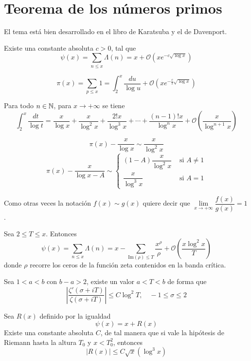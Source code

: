 \documentclass[TAN.tex]{subfiles}
\begin{document}
\section{Teorema de los números primos}
El tema está bien desarrollado en el libro de Karatsuba y el de Davenport.

\begin{teorema}
Existe una constante absoluta $c > 0$, tal que
\[ ψ(x) = \sum_{n≤x} Λ(n) = x + \mathcal{O}\left(xe^{-c\sqrt{\log x}}\right) \]
\end{teorema}

\begin{teorema}
\[ π(x) = \sum_{p≤x} 1 = \int_2^x \frac{du}{\log u} + \mathcal{O}\left(xe^{-\frac{c}{2} \sqrt{\log x}}\right) \]
\end{teorema}

\begin{prop}
Para todo $n \in \mathbb{N}$, para $x \to +∞$ se tiene
\[ \int_2^x \frac{dt}{\log t} = \frac{x}{\log x} + \frac{x}{\log^2 x} + \frac{2!x}{\log^3 x} + \cdots + \frac{(n-1)!x}{\log^n x} + \mathcal{O}\left(\frac{x}{\log^{n+1}x}\right) \]
\end{prop}

\begin{coro}
\[ π(x) - \frac{x}{\log x} \sim \frac{x}{\log^2 x} \]
\[ π(x) - \frac{x}{\log x - A} \sim \begin{cases}
	(1-A)\dfrac{x}{\log^2 x} &\text{ si }A \neq 1\\
	\dfrac{x}{\log^3 x} &\text{ si }A=1
\end{cases}\]
\end{coro}

Como otras veces la notación $f(x) \sim g(x)$ quiere decir que $\lim\limits_{x \to +∞} \dfrac{f(x)}{g(x)} = 1$.

\begin{teorema}
Sea $2 ≤ T ≤ x$. Entonces
\[ ψ(x) = \sum_{n≤x} Λ(n) = x - \sum_{\text{Im}(ρ)≤T} \frac{x^ρ}{ρ} + \mathcal{O}\left(\frac{x\log^2 x}{T}\right) \]
donde $ρ$ recorre los ceros de la función zeta contenidos en la banda crítica.
\end{teorema}

\begin{lemma}
Sea $1<a<b$ con $b-a>2$, existe un valor $a<T<b$ de forma que
\[ \left|\frac{ζ'(σ+iT)}{ζ(σ+iT)}\right| ≤ C \log^2 T, \quad -1≤σ≤2 \]
\end{lemma}

\begin{teorema}
Sea $R(x)$ definido por la igualdad
\[ ψ(x) = x + R(x) \]
Existe una constante absoluta $C$, de tal manera que si vale la hipótesis de Riemann hasta la altura $T_0$ y $x < T_0^2$, entonces
\[ |R(x)| ≤ C \sqrt{x} (\log^3 x) \]
\end{teorema}
\end{document}
